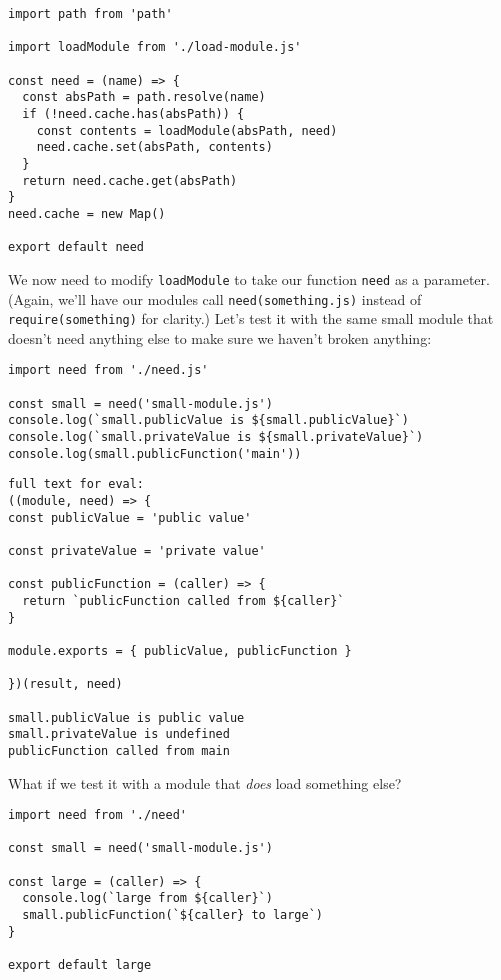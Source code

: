 \documentclass[krantzl]{krantz}
\begin{document}
\begin{lstlisting}[frame=tblr]
import path from 'path'

import loadModule from './load-module.js'

const need = (name) => {
  const absPath = path.resolve(name)
  if (!need.cache.has(absPath)) {
    const contents = loadModule(absPath, need)
    need.cache.set(absPath, contents)
  }
  return need.cache.get(absPath)
}
need.cache = new Map()

export default need
\end{lstlisting}



We now need to modify \texttt{loadModule} to take our function \texttt{need} as a parameter.
(Again, we’ll have our modules call \texttt{need({\textquotesingle}something.js{\textquotesingle})} instead of \texttt{require({\textquotesingle}something{\textquotesingle})} for clarity.)
Let’s test it with the same small module that doesn’t need anything else to make sure we haven’t broken anything:


\begin{lstlisting}[frame=tblr]
import need from './need.js'

const small = need('small-module.js')
console.log(`small.publicValue is ${small.publicValue}`)
console.log(`small.privateValue is ${small.privateValue}`)
console.log(small.publicFunction('main'))
\end{lstlisting}



\begin{lstlisting}[frame=tblr,backgroundcolor=\color{black!5}]
full text for eval:
((module, need) => {
const publicValue = 'public value'

const privateValue = 'private value'

const publicFunction = (caller) => {
  return `publicFunction called from ${caller}`
}

module.exports = { publicValue, publicFunction }

})(result, need)

small.publicValue is public value
small.privateValue is undefined
publicFunction called from main
\end{lstlisting}



What if we test it with a module that \emph{does} load something else?


\begin{lstlisting}[frame=tblr]
import need from './need'

const small = need('small-module.js')

const large = (caller) => {
  console.log(`large from ${caller}`)
  small.publicFunction(`${caller} to large`)
}

export default large
\end{lstlisting}
\end{document}
